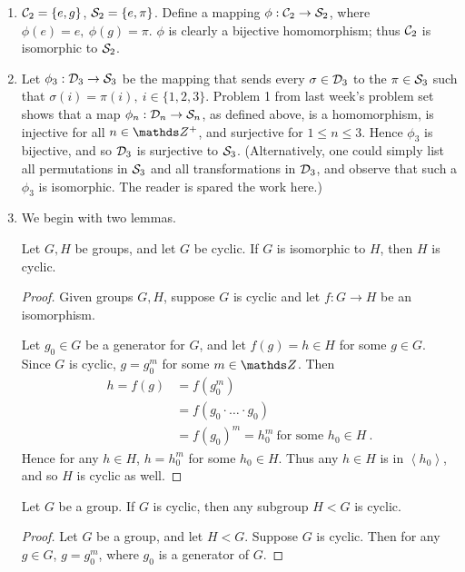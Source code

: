 \documentclass{homework}
\begin{document}
\begin{solution}
  \begin{enumerate}[label=(\alph*)]
    \item $\mathcal{C}_2=\{ e,g \}$, $ \mathcal{S}_2=\{ e,\pi \}$. Define a mapping $\phi:\mathcal{C}_2\to \mathcal{S}_2$,
      where $\phi(e)=e,\ \phi(g)=\pi$. $\phi$ is clearly a bijective homomorphism; thus $\mathcal{C}_2$ 
      is isomorphic to $ \mathcal{S}_2$.
    \item Let $\phi_3:\mathcal{D}_3\to \mathcal{S}_3$ be the mapping that sends every $\sigma\in \mathcal{D}_3$ to the
      $\pi\in \mathcal{S}_3$ such that $\sigma(i)=\pi(i),\ i\in \{ 1,2,3 \}$. Problem 1 from last week's
      problem set shows that a map $\phi_n:\mathcal{D}_n\to \mathcal{S}_n$, as defined above, is a homomorphism,
      is injective for all $n\in \Z^+$, and surjective for $1\le n\le 3$. Hence $\phi_3$ is
      bijective, and so $\mathcal{D}_3$ is surjective to $\mathcal{S}_3$. (Alternatively, one could simply list
      all permutations in $\mathcal{S}_3$ and all transformations in $\mathcal{D}_3$, and observe that such a
      $\phi_3$ is isomorphic. The reader is spared the work here.)
    \item We begin with two lemmas.
      \begin{lemma}[]
        Let $G,H$ be groups, and let $G$ be cyclic. If $G$ is isomorphic to $H$, then $H$ is cyclic.
      \end{lemma}
      \begin{proof}[Proof]
        Given groups $G,H$, suppose $G$ is cyclic and let $f:G\to H$ be an isomorphism. 

        Let $ g_0\in G$ be a generator for $G$, and let $f(g)=h\in H$ for some $g\in G$. Since $G$ 
        is cyclic, $g=g_0^{m}$ for some $m\in \Z$. Then 
        \begin{align*}
          h=f(g)&=f(g_0^{m})\\
                &= f(g_0\cdot \ldots\cdot g_0) \\
                &= f(g_0)^{m}=h_0^{m}~\text{for some $h_0\in H$}~
        .\end{align*}
        Hence for any $h\in H$, $h=h_0^{m}$ for some $ h_0\in H$. Thus any  $h\in H$ is in $\left<
        h_0\right>$, and so $H$ is cyclic as well.
      \end{proof}

      \begin{lemma}[]
        Let $G$ be a group. If $G$ is cyclic, then any subgroup $H<G$ is cyclic.
      \end{lemma}
      \begin{proof}[Proof]
        Let $G$ be a group, and let $H<G$. Suppose $G$ is cyclic. Then for any $g\in G$,
        $g=g_0^{m}$, where $ g_0$ is a generator of $G$.


\end{proof}
\end{enumerate}
\end{solution}
\end{document}
